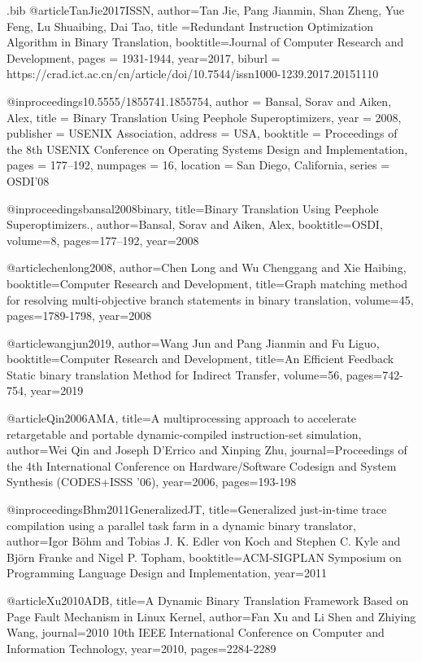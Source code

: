 \begin{filecontents}{\jobname.bib}
@article{TanJie2017ISSN,
author={Tan Jie, Pang Jianmin, Shan Zheng, Yue Feng, Lu Shuaibing, Dai Tao},
title ={Redundant Instruction Optimization Algorithm in Binary Translation},
booktitle={Journal of Computer Research and Development},
pages = {1931-1944},
year={2017}, 
biburl = {https://crad.ict.ac.cn/cn/article/doi/10.7544/issn1000-1239.2017.20151110}
}

@inproceedings{10.5555/1855741.1855754,
author = {Bansal, Sorav and Aiken, Alex},
title = {Binary Translation Using Peephole Superoptimizers},
year = {2008},
publisher = {USENIX Association},
address = {USA},
booktitle = {Proceedings of the 8th USENIX Conference on Operating Systems Design and Implementation},
pages = {177–192},
numpages = {16},
location = {San Diego, California},
series = {OSDI'08}
}

@inproceedings{bansal2008binary,
  title={Binary Translation Using Peephole Superoptimizers.},
  author={Bansal, Sorav and Aiken, Alex},
  booktitle={OSDI},
  volume={8},
  pages={177--192},
  year={2008}
}

@article{chenlong2008,
    author={Chen Long and Wu Chenggang and Xie Haibing},
    booktitle={Computer Research and Development},
    title={Graph matching method for resolving multi-objective branch statements in binary translation},
    volume={45},
    pages={1789-1798},
    year={2008}
}

@article{wangjun2019,
    author={Wang Jun and Pang Jianmin and Fu Liguo},
    booktitle={Computer Research and Development},
    title={An Efficient Feedback Static binary translation Method for Indirect Transfer},
    volume={56},
    pages={742-754},
    year={2019}
}

@article{Qin2006AMA,
  title={A multiprocessing approach to accelerate retargetable and portable dynamic-compiled instruction-set simulation},
  author={Wei Qin and Joseph D'Errico and Xinping Zhu},
  journal={Proceedings of the 4th International Conference on Hardware/Software Codesign and System Synthesis (CODES+ISSS '06)},
  year={2006},
  pages={193-198}
}

@inproceedings{Bhm2011GeneralizedJT,
  title={Generalized just-in-time trace compilation using a parallel task farm in a dynamic binary translator},
  author={Igor B{\"o}hm and Tobias J. K. Edler von Koch and Stephen C. Kyle and Bj{\"o}rn Franke and Nigel P. Topham},
  booktitle={ACM-SIGPLAN Symposium on Programming Language Design and Implementation},
  year={2011}
}

@article{Xu2010ADB,
  title={A Dynamic Binary Translation Framework Based on Page Fault Mechanism in Linux Kernel},
  author={Fan Xu and Li Shen and Zhiying Wang},
  journal={2010 10th IEEE International Conference on Computer and Information Technology},
  year={2010},
  pages={2284-2289}
}


\end{filecontents}
